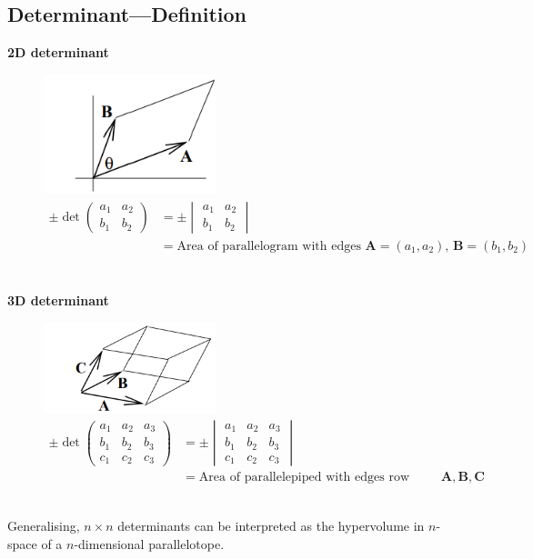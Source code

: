 \documentclass{report}
\begin{document}
\subsection{Determinant---Definition} %
\textbf{2D determinant}
\begin{figure}[h]
\includegraphics[width=5cm]{Capture74}\\
\centering
\begin{align*}
\pm\det
\begin{pmatrix}
a_1 & a_2\\
b_1 & b_2
\end{pmatrix}
&=\pm
\begin{vmatrix}
a_1 & a_2\\
b_1 & b_2
\end{vmatrix}\\
&=\text{Area of parallelogram with edges $\mathbf{A}=(a_1,a_2)$, $\mathbf{B}=(b_1,b_2)$}\\
\end{align*}
\end{figure}\\
\textbf{3D determinant}
\begin{figure}[h]
\includegraphics[width=5cm]{Capture75}\\
\centering
\begin{align*}
\pm\det
\begin{pmatrix}
a_1 & a_2 & a_3\\
b_1 & b_2 & b_3\\
c_1 & c_2 & c_3
\end{pmatrix}
&=\pm
\begin{vmatrix}
a_1 & a_2 & a_3\\
b_1 & b_2 & b_3\\
c_1 & c_2 & c_3
\end{vmatrix}\\
&=\text{Area of parallelepiped with edges row vectors $\mathbf{A,B,C}$}.
\end{align*}
\end{figure}\\
Generalising, $n\times n$ determinants can be interpreted as the hypervolume 
in $n$-space of a $n$-dimensional parallelotope.
\newpage
\end{document}
